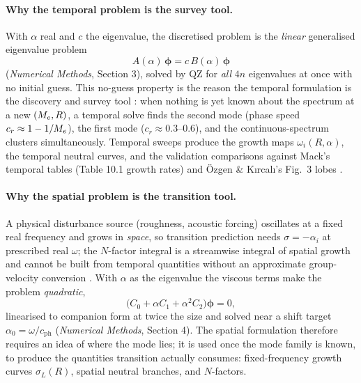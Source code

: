 \documentclass[11pt]{article}
\begin{document}
\paragraph{Why the temporal problem is the survey tool.} With $\alpha$ real and $c$ the
eigenvalue, the discretised problem is the \emph{linear} generalised eigenvalue problem
\begin{equation}\label{eq:gevp}
  \boxed{\;A(\alpha)\,\boldsymbol\phi=c\,B(\alpha)\,\boldsymbol\phi\;}
\end{equation}
(\emph{Numerical Methods}, Section 3), solved by QZ \cite{molerstewart1973} for \emph{all} $4n$
eigenvalues at once with no initial guess. This no-guess property is the reason the temporal
formulation is the discovery and survey tool \cite{malik1990}: when nothing is yet known about
the spectrum at a new $(M_e,R)$, a temporal solve finds the second mode (phase speed
$c_r\approx1-1/M_e$), the first mode ($c_r\approx0.3$--$0.6$), and the continuous-spectrum
clusters simultaneously. Temporal sweeps produce the growth maps $\omega_i(R,\alpha)$, the
temporal neutral curves, and the validation comparisons against Mack's temporal tables (Table
10.1 growth rates) and \"Ozgen \& K{\i}rcal{\i}'s Fig.~3 lobes \cite{mack1984,ozgen2008}.

\paragraph{Why the spatial problem is the transition tool.} A physical disturbance source
(roughness, acoustic forcing) oscillates at a fixed real frequency and grows in \emph{space}, so
transition prediction needs $\sigma=-\alpha_i$ at prescribed real $\omega$; the $N$-factor
integral is a streamwise integral of spatial growth and cannot be built from temporal quantities
without an approximate group-velocity conversion \cite{gaster1962}. With $\alpha$ as the
eigenvalue the viscous terms make the problem \emph{quadratic},
\begin{equation}\label{eq:qep}
  \big(C_0+\alpha C_1+\alpha^2C_2\big)\boldsymbol\phi=0,
\end{equation}
linearised to companion form at twice the size and solved near a shift target
$\alpha_0=\omega/c_{\mathrm{ph}}$ \cite{tisseur2001} (\emph{Numerical Methods}, Section 4). The
spatial formulation therefore requires an idea of where the mode lies; it is used once the mode
family is known, to produce the quantities transition actually consumes: fixed-frequency growth
curves $\sigma_L(R)$, spatial neutral branches, and $N$-factors.
\end{document}
